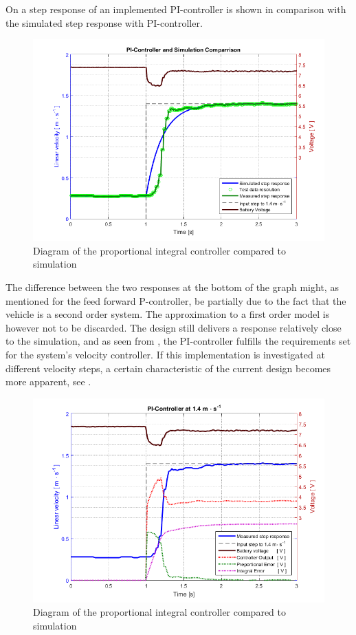 On  a step response of an implemented PI-controller is shown in comparison with the simulated step response with PI-controller.
%
\begin{figure}[H]
 	\centering
 	\includegraphics[width=.8\textwidth]{figures/PIcontrollerStepRealVsSim}
 	\caption{Diagram of the proportional integral controller compared to simulation}
 	\label{fig:PIcontrollerStepRealVsSim}
\end{figure}
%
The difference between the two responses at the bottom of the graph might, as mentioned for the feed forward P-controller, be partially due to the fact that the vehicle is a second order system. The approximation to a first order model is however not to be discarded. The design still delivers a response relatively close to the simulation, and as seen from , the PI-controller fulfills the requirements set for the system's velocity controller.
If this implementation is investigated at different velocity steps, a certain characteristic of the current design becomes more apparent, see .
%
\begin{figure}[H]
 	\centering
 	\includegraphics[width=.8\textwidth]{figures/PInew}
 	\caption{Diagram of the proportional integral controller compared to simulation}
 	\label{fig:PInew}
\end{figure}
%

